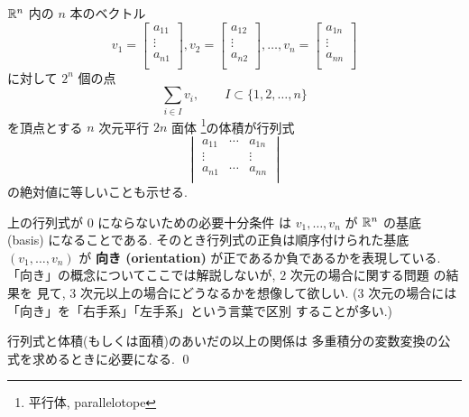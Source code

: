 \documentclass[12pt,twoside]{jarticle}
\begin{document}
\begin{guide}
  \label{guide:|det|=Vol}
  ${\mathbb R}^n$ 内の $n$ 本のベクトル
  \begin{equation*}
    v_1=
    \begin{bmatrix}
      a_{11} \\
      \vdots \\
      a_{n1} \\
    \end{bmatrix},
    v_2=
    \begin{bmatrix}
      a_{12} \\
      \vdots \\
      a_{n2} \\
    \end{bmatrix},
    \ldots,
    v_n=
    \begin{bmatrix}
      a_{1n} \\
      \vdots \\
      a_{nn} \\
    \end{bmatrix}
  \end{equation*}
  に対して $2^n$ 個の点
  \begin{equation*}
    \sum_{i\in I} v_i, \qquad I\subset\{1,2,\ldots,n\}
  \end{equation*}
  を頂点とする $n$ 次元平行 $2n$ 面体%
  \footnote{平行体, parallelotope}の体積が行列式
  \begin{equation*}
    \begin{vmatrix}
      a_{11} & \cdots & a_{1n} \\
      \vdots &        & \vdots \\
      a_{n1} & \cdots & a_{nn} \\
    \end{vmatrix}
  \end{equation*}
  の絶対値に等しいことも示せる.

  上の行列式が $0$ にならないための必要十分条件
  は $v_1,\ldots,v_n$ が ${\mathbb R}^n$ の基底 (basis) になることである.
  そのとき行列式の正負は順序付けられた基底 $(v_1,\ldots,v_n)$ が
  {\bf 向き (orientation)} が正であるか負であるかを表現している.
  「向き」の概念についてここでは解説しないが, 
  $2$ 次元の場合に関する問題  の結果を
  見て, $3$ 次元以上の場合にどうなるかを想像して欲しい.
  ($3$ 次元の場合には「向き」を「右手系」「左手系」という言葉で区別
  することが多い.)

  行列式と体積(もしくは面積)のあいだの以上の関係は
  多重積分の変数変換の公式を求めるときに必要になる.
  \qed
\end{guide}
\end{document}
